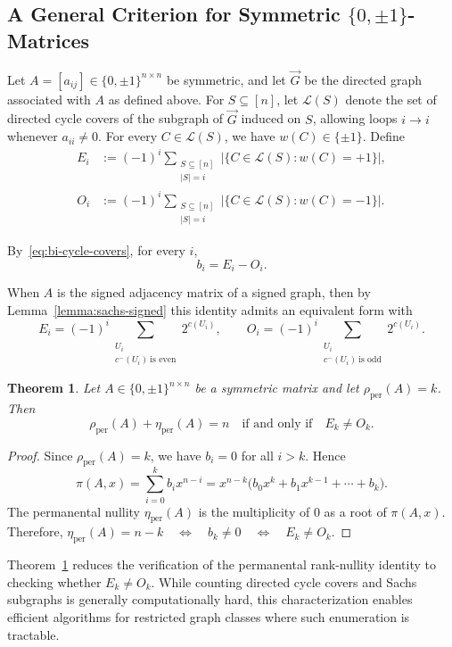 \documentclass[11pt]{article}
\theoremstyle{plain}
\newtheorem{theorem}{Theorem}[section]   %
\theoremstyle{definition}
\theoremstyle{remark}
\begin{document}
\subsection{A General Criterion for Symmetric \texorpdfstring{$\{0,\pm1\}$}{\{0,±1\}}-Matrices}

Let \(A=[a_{ij}]\in\{0,\pm1\}^{n\times n}\) be symmetric, and let \(\vec G\) be the
directed graph associated with \(A\) as defined above.
For \(S\subseteq[n]\), let \(\mathcal L(S)\) denote the set of directed cycle covers
of the subgraph of \(\vec G\) induced on \(S\), allowing loops \(i\to i\) whenever
\(a_{ii}\neq 0\).
For every \(C\in\mathcal L(S)\), we have \(w(C)\in\{\pm1\}\).
Define
\[
\begin{aligned}
E_i &:= (-1)^i \sum_{\substack{S\subseteq[n]\\ |S|=i}}
\bigl|\{C\in\mathcal L(S): w(C)=+1\}\bigr|,\\
O_i &:= (-1)^i \sum_{\substack{S\subseteq[n]\\ |S|=i}}
\bigl|\{C\in\mathcal L(S): w(C)=-1\}\bigr|.
\end{aligned}
\]

By~\eqref{eq:bi-cycle-covers}, for every \(i\),
\[
b_i = E_i - O_i.
\]

When \(A\) is the signed adjacency matrix of a signed graph, then by Lemma~\ref{lemma:sachs-signed} this identity admits an equivalent form with
\[
E_i = (-1)^{i} \sum_{\substack{U_i\ \\ c^-(U_i)\ \text{is even}}} 2^{c(U_i)},
\qquad
O_i = (-1)^{i} \sum_{\substack{U_i\ \\ c^-(U_i)\ \text{is odd}}} 2^{c(U_i)}.
\]


\begin{theorem}\label{thm:general-case}
Let \(A\in\{0,\pm1\}^{n\times n}\) be a symmetric matrix and let
\(\rho_{\operatorname{per}}(A)=k\). Then
\[
\rho_{\operatorname{per}}(A)+\eta_{\operatorname{per}}(A)=n
\quad\text{if and only if}\quad
E_k\neq O_k.
\]
\end{theorem}

\begin{proof}
Since \(\rho_{\operatorname{per}}(A)=k\), we have \(b_i=0\) for all \(i>k\).
Hence
\[
\pi(A,x)
=\sum_{i=0}^k b_i x^{n-i}
=x^{n-k}\bigl(b_0x^k+b_1x^{k-1}+\cdots+b_k\bigr).
\]
The permanental nullity \(\eta_{\operatorname{per}}(A)\) is the multiplicity of
\(0\) as a root of \(\pi(A,x)\).
Therefore,
\(
\eta_{\operatorname{per}}(A)=n-k
\quad\Longleftrightarrow\quad
b_k\neq 0
\quad\Longleftrightarrow\quad
E_k\neq O_k.
\)
\end{proof}
Theorem~\ref{thm:general-case} reduces the verification of the permanental rank-nullity identity to checking whether \(E_k \neq O_k\). While counting directed cycle covers and Sachs subgraphs is generally computationally hard, this characterization enables efficient algorithms for restricted graph classes where such enumeration is tractable.
\end{document}
